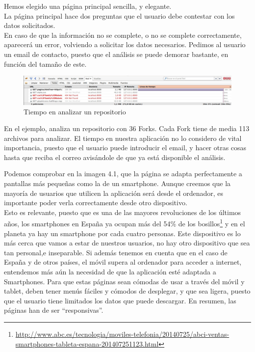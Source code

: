 \documentclass[a4paper, 12pt]{book}
\begin{document}
Hemos elegido una página principal sencilla, y elegante. \\
La página principal hace dos preguntas que el usuario debe contestar con los datos solicitados.\\
En caso de que la información no se complete, o no se complete correctamente, aparecerá un error, volviendo a solicitar los datos necesarios. Pedimos al usuario un email de contacto, puesto que el análisis se puede demorar bastante, en función del tamaño de este.\\
\begin{figure}[H]
\centering
\includegraphics[scale=0.35]{img/tiempo.jpg} 
\caption{Tiempo en analizar un repositorio}
\end{figure}

En el ejemplo, analiza un repositorio con 36 Forks. Cada Fork tiene de media 113 archivos para analizar. El tiempo en nuestra aplicación no lo considero de vital importancia, puesto que el usuario puede introducir el email, y hacer otras cosas hasta que reciba el correo avisándole de que ya está disponible el análisis.

Podemos comprobar en la imagen 4.1, que la página se adapta perfectamente a pantallas más pequeñas como la de un smartphone. Aunque creemos que la mayoría de usuarios que utilicen la aplicación será desde el ordenador, es importante poder verla correctamente desde otro dispositivo.\\ Esto es relevante, puesto que es una de las mayores revoluciones de los últimos años, los smartphones en España ya ocupan más del 54\% de los bosillos\footnote{\url{http://www.abc.es/tecnologia/moviles-telefonia/20140725/abci-ventas-smartphones-tableta-espana-201407251123.html}} y en el planeta ya hay un smartphone por cada cuatro personas. Este dispositivo es lo más cerca que vamos a estar de nuestros usuarios, no hay otro dispositivo que sea tan personal,e inseparable. Si además tenemos en cuenta que en el caso de España y de otros países, el móvil supera al ordenador para acceder a internet, entendemos más aún la necesidad de que la aplicación esté adaptada a Smartphones. Para que estas páginas sean cómodas de usar a través del móvil y tablet, deben tener menús fáciles y cómodos de desplegar, y que sea ligera, puesto que el usuario tiene limitados los datos que puede descargar. En resumen, las páginas han de ser ``responsivas''.
\end{document}
